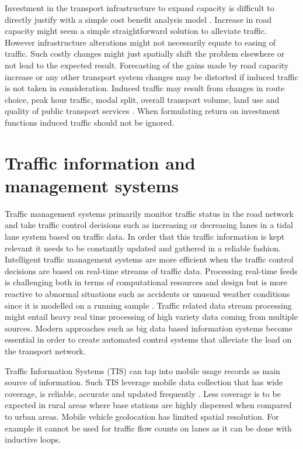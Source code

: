 \documentclass[12pt, a4paper]{report}
\theoremstyle{definition}
\theoremstyle{definition}%
\theoremstyle{definition}%
\theoremstyle{definition}%
\theoremstyle{definition}%
\theoremstyle{definition}%
\begin{document}
Investment in the transport infrastructure to expand capacity is difficult to directly justify with a simple cost benefit analysis model \cite{atkinson2006cost}. Increase in road capacity might seem a simple straightforward solution to alleviate traffic.  However infrastructure alterations might not necessarily equate to easing of traffic. Such costly changes might just spatially shift the problem elsewhere or not lead to the expected result. Forecasting of the gains made by road capacity increase or any other transport system changes may be distorted if induced traffic is not taken in consideration. Induced traffic may result from changes in route choice, peak hour traffic, modal split, overall transport volume, land use and quality of public transport services \cite{Naess2012}. When formulating return on investment functions induced traffic should not be ignored.


\section{Traffic information and management systems}\label{section:introduction:traffic_information_and_management_systems}

Traffic management systems primarily monitor traffic status in the road network and take traffic control decisions such as increasing or decreasing lanes in a tidal lane system based on traffic data. In order that this traffic information is kept relevant it needs to be constantly updated and gathered in a reliable fashion. Intelligent traffic management systems are more efficient when the traffic control decisions are based on real-time streams of traffic data. Processing real-time feeds is challenging both in terms of computational resources and design but is more reactive to abnormal situations such as accidents or unusual weather conditions since it is modelled on a running sample \cite{Toole2015}. Traffic related data stream processing might entail heavy real time processing of high variety data coming from multiple sources. Modern approaches such as big data based information systems become essential in order to create automated control systems that alleviate the load on the transport network\cite{Liu2014}.

Traffic Information Systems (TIS) can tap into mobile usage records as main source of information. Such TIS leverage mobile data collection that has wide coverage, is reliable, accurate and updated frequently \cite{Leduc2008}. Less coverage is to be expected in rural areas where base stations are highly dispersed when compared to urban areas. Mobile vehicle geolocation has limited spatial resolution. For example it cannot be used for traffic flow counts on lanes as it can be done with inductive loops. 
\end{document}

